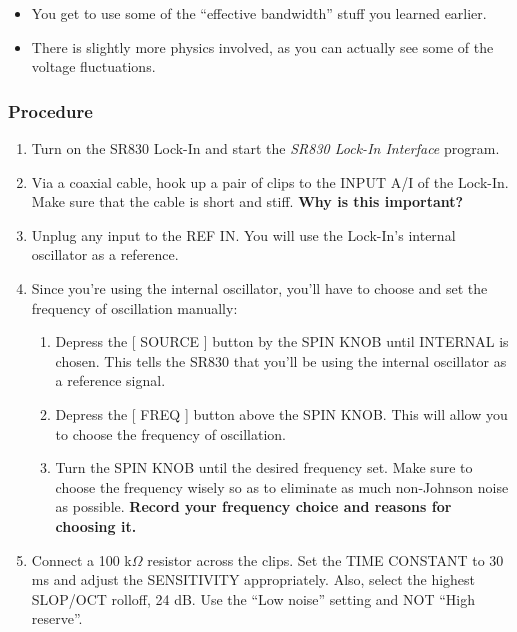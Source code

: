\documentclass{../lab}
\begin{document}
\begin{itemize}
    \item You get to use some of the ``effective bandwidth'' stuff you learned earlier.

    \item There is slightly more physics involved, as you can actually see some of the voltage fluctuations.

\end{itemize}

\subsubsection{Procedure}

\begin{enumerate}
    \item Turn on the SR830 Lock-In and start the \emph{SR830 Lock-In Interface} program.

    \item Via a coaxial cable, hook up a pair of clips to the INPUT A/I of the Lock-In. Make sure that the cable is short and stiff. \textbf{Why is this important?}

    \item Unplug any input to the REF IN. You will use the Lock-In's internal oscillator as a reference.

    \item Since you're using the internal oscillator, you'll have to choose and set the frequency of oscillation manually:
    \begin{enumerate}
        \item Depress the [ SOURCE ] button by the SPIN KNOB until INTERNAL is chosen. This tells the SR830 that you'll be using the internal oscillator as a reference signal.

        \item Depress the [ FREQ ] button above the SPIN KNOB. This will allow you to choose the frequency of oscillation.

        \item Turn the SPIN KNOB until the desired frequency set. Make sure to choose the frequency wisely so as to eliminate as much non-Johnson noise as possible. \textbf{Record your frequency choice and reasons for choosing it.}

    \end{enumerate}

    \item Connect a 100 k$\Omega$ resistor across the clips. Set the TIME CONSTANT to 30 ms and adjust the SENSITIVITY appropriately. Also, select the highest SLOP/OCT rolloff, 24 dB. Use the ``Low noise'' setting and NOT ``High reserve''.


\end{enumerate}
\end{document}
